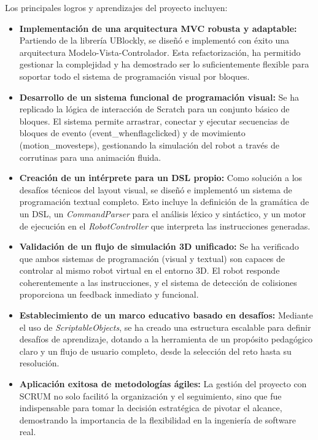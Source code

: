 Los principales logros y aprendizajes del proyecto incluyen:
\begin{itemize}
	\item \textbf{Implementación de una arquitectura MVC robusta y adaptable:}
	Partiendo de la librería UBlockly, se diseñó e implementó con éxito una arquitectura Modelo-Vista-Controlador. Esta refactorización,  ha permitido gestionar la complejidad y ha demostrado ser lo suficientemente flexible para soportar todo el sistema de programación visual por bloques.
	
	\item \textbf{Desarrollo de un sistema funcional de programación visual:}
	Se ha replicado la lógica de interacción de Scratch para un conjunto básico de bloques. El sistema permite arrastrar, conectar y ejecutar secuencias de bloques de evento (event\_whenflagclicked) y de movimiento (motion\_movesteps), gestionando la simulación del robot a través de corrutinas para una animación fluida.
	
	\item \textbf{Creación de un intérprete para un DSL propio:}
	Como solución a los desafíos técnicos del layout visual, se diseñó e implementó un sistema de programación textual completo. Esto incluye la definición de la gramática de un DSL, un \textit{CommandParser} para el análisis léxico y sintáctico, y un motor de ejecución en el \textit{RobotController} que interpreta las instrucciones generadas.
	
	\item \textbf{Validación de un flujo de simulación 3D unificado:}
	Se ha verificado que ambos sistemas de programación (visual y textual) son capaces de controlar al mismo robot virtual en el entorno 3D. El robot responde coherentemente a las instrucciones, y el sistema de detección de colisiones proporciona un feedback inmediato y funcional.
	
	\item \textbf{Establecimiento de un marco educativo basado en desafíos:}
	Mediante el uso de \textit{ScriptableObjects}, se ha creado una estructura escalable para definir desafíos de aprendizaje, dotando a la herramienta de un propósito pedagógico claro y un flujo de usuario completo, desde la selección del reto hasta su resolución.
	
	\item \textbf{Aplicación exitosa de metodologías ágiles:}
	La gestión del proyecto con SCRUM no solo facilitó la organización y el seguimiento, sino que fue indispensable para tomar la decisión estratégica de pivotar el alcance, demostrando la importancia de la flexibilidad en la ingeniería de software real.
\end{itemize}

